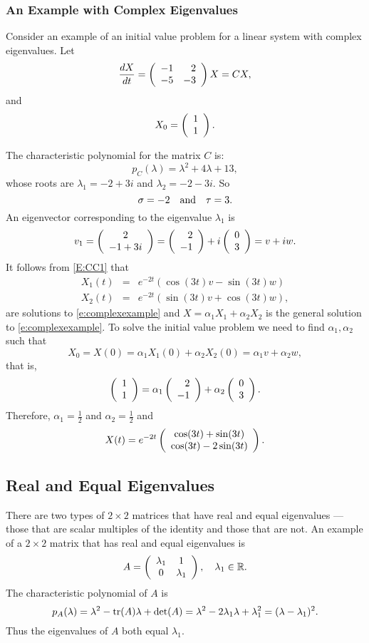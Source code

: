 \documentclass{ximera}
\begin{document}
\subsubsection*{An Example with Complex Eigenvalues}

Consider an example of an initial value problem for a linear system with
complex eigenvalues.  Let
\begin{equation}  \label{e:complexexample}
\frac{dX}{dt} = \left(\begin{array}{rr} -1 & 2\\ -5 &-3\end{array}\right) X = CX,
\end{equation}
and
\[
X_0=\left(\begin{array}{r} 1 \\ 1\end{array}\right).
\]

The characteristic polynomial for the
matrix $C$ is:
\[
p_C(\lambda) = \lambda^2 +4\lambda + 13,
\]
whose roots are $\lambda_1 = -2+3i$ and $\lambda_2 = -2-3i$. So
\[
\sigma = -2 \quad\mbox{and}\quad \tau = 3.
\]
An eigenvector corresponding to the eigenvalue $\lambda_1$ is
\[
v_1 = \left(\begin{array}{c} 2 \\ -1+3i\end{array}\right) = \left(\begin{array}{r} 2 \\ -1\end{array}\right)+i\left(\begin{array}{r} 0 \\ 3\end{array}\right)=v+iw.
\]
It follows from \eqref{E:CC1} that
\[
\begin{array}{rcl}
X_1(t) & = & e^{-2t}(\cos(3t)v -\sin(3t)w)\\
X_2(t) & = & e^{-2t}(\sin(3t)v +\cos(3t)w),
\end{array}
\]
are solutions to \eqref{e:complexexample} and $X=\alpha_1X_1+\alpha_2X_2$ is
the general solution to \eqref{e:complexexample}.  To solve the initial value
problem we need to find $\alpha_1,\alpha_2$ such that
\[
X_0 = X(0) = \alpha_1X_1(0) + \alpha_2X_2(0) = \alpha_1 v + \alpha_2 w,
\]
that is,
\[
\left(\begin{array}{r} 1 \\ 1\end{array}\right) = \alpha_1\left(\begin{array}{r} 2 \\ -1\end{array}\right)  + \alpha_2\left(\begin{array}{r} 0 \\ 3\end{array}\right).
\]
Therefore, $\alpha_1 = \frac{1}{2}$ and $\alpha_2=\frac{1}{2}$ and
\begin{equation}  \label{e:complexexampleans}
X(t) =  e^{-2t}\left(\begin{array}{c} \cos(3t)+\sin(3t) \\ \cos(3t)-2\sin(3t)\end{array}\right).
\end{equation}

\subsection*{Real and Equal Eigenvalues}

There are two types of $2\times 2$ matrices that have real and equal
eigenvalues --- those that are scalar multiples of the identity and those
that are not.  An example of a $2\times 2$ matrix that has real and equal
eigenvalues is
\begin{equation}  \label{E:equalex}
A = \left(\begin{array}{cc} \lambda_1 & 1\\ 0 &\lambda_1\end{array}\right), \quad \lambda_1\in\mbox{$\Bbb{R}$}.
\end{equation}
The characteristic polynomial of $A$ is
\[
p_A(\lambda) = \lambda^2 - {\rm tr}(A)\lambda + \det(A) =
\lambda^2 -2\lambda_1\lambda + \lambda_1^2 = (\lambda-\lambda_1)^2.
\]
Thus the eigenvalues of $A$ both equal $\lambda_1$.
\end{document}
